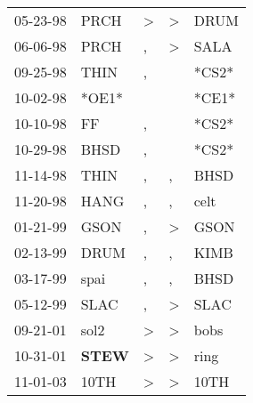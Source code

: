 \begin{supertabular}{p{0.07\textwidth}p{0.06\textwidth}p{0.02\textwidth}p{0.02\textwidth}p{0.06\textwidth}}
 05-23-98\textsuperscript{} &           PRCH\textsuperscript{} &  \textgreater &  \textgreater &  DRUM\textsuperscript{} \\
 06-06-98\textsuperscript{} &           PRCH\textsuperscript{} &             , &  \textgreater &  SALA\textsuperscript{} \\
 09-25-98\textsuperscript{} &           THIN\textsuperscript{} &             , &               &                   *CS2* \\
 10-02-98\textsuperscript{} &                            *OE1* &               &               &                   *CE1* \\
 10-10-98\textsuperscript{} &             FF\textsuperscript{} &             , &               &                   *CS2* \\
 10-29-98\textsuperscript{} &           BHSD\textsuperscript{} &             , &               &                   *CS2* \\
 11-14-98\textsuperscript{} &           THIN\textsuperscript{} &             , &             , &  BHSD\textsuperscript{} \\
 11-20-98\textsuperscript{} &           HANG\textsuperscript{} &             , &             , &  celt\textsuperscript{} \\
 01-21-99\textsuperscript{} &           GSON\textsuperscript{} &             , &  \textgreater &  GSON\textsuperscript{} \\
 02-13-99\textsuperscript{} &           DRUM\textsuperscript{} &             , &             , &  KIMB\textsuperscript{} \\
 03-17-99\textsuperscript{} &           spai\textsuperscript{} &             , &             , &  BHSD\textsuperscript{} \\
 05-12-99\textsuperscript{} &           SLAC\textsuperscript{} &             , &  \textgreater &  SLAC\textsuperscript{} \\
 09-21-01\textsuperscript{} &           sol2\textsuperscript{} &  \textgreater &  \textgreater &  bobs\textsuperscript{} \\
 10-31-01\textsuperscript{} &  \textbf{STEW\textsuperscript{}} &  \textgreater &  \textgreater &  ring\textsuperscript{} \\
 11-01-03\textsuperscript{} &           10TH\textsuperscript{} &  \textgreater &  \textgreater &  10TH\textsuperscript{} \\
\end{supertabular}
